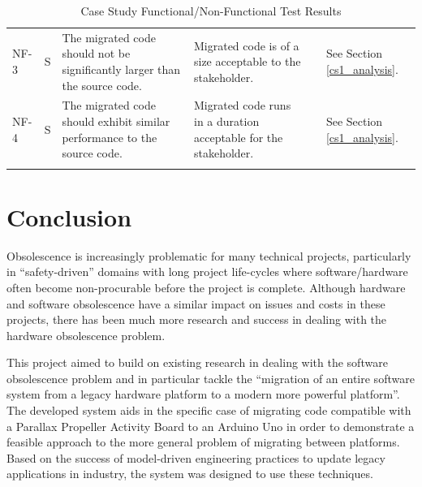 \documentclass{UoYCSproject}
\renewcommand{\checkmark}{\ding{51}}
\begin{document}
\begin{landscape}
\begin{longtable}{@{}p{}p{}p{}p{}p{}p{}@{}}
  NF-3 & S & The migrated code should not be significantly larger than the source code. & Migrated code is of a size acceptable to the stakeholder. & \checkmark & See Section \ref{cs1_analysis}. \\
  NF-4 & S & The migrated code should exhibit similar performance to the source code. & Migrated code runs in a duration acceptable for the stakeholder. & \checkmark & See Section \ref{cs1_analysis}. \\
    \bottomrule
\caption{Case Study Functional/Non-Functional Test Results}
\label{table:case_study_func_test_results}
  \end{longtable}
\end{landscape}

\restoregeometry

\chapter{Conclusion} \label{conc}
Obsolescence is increasingly problematic for many technical projects, particularly in ``safety-driven'' domains with long project life-cycles where software/hardware often become non-procurable before the project is complete. Although hardware and software obsolescence have a similar impact on issues and costs in these projects, there has been much more research and success in dealing with the hardware obsolescence problem.

This project aimed to build on existing research in dealing with the software obsolescence problem and in particular tackle the ``migration of an entire software system from a legacy hardware platform to a modern more powerful platform''. The developed system aids in the specific case of migrating code compatible with a Parallax Propeller Activity Board to an Arduino Uno in order to demonstrate a feasible approach to the more general problem of migrating between platforms. Based on the success of model-driven engineering practices to update legacy applications in industry, the system was designed to use these techniques.
\end{document}
